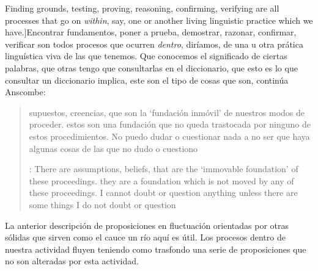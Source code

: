 Finding grounds, testing, proving, reasoning, confirming, verifying are all processes that go on \emph{within}, say, one or another living linguistic practice which we have.]{Encontrar fundamentos, poner a prueba, demostrar, razonar, confirmar, verificar son todos procesos que ocurren \emph{dentro}, diríamos, de una u otra prática linguística viva de las que tenemos.} Que conocemos el significado de ciertas palabras, que otras tengo que consultarlas en el diccionario, que esto es lo que consultar un diccionario implica, este son el tipo de cosas que son, continúa Anscombe: \blockquote[{\cite[130]{anscombe1981parmenides:qli}}: There are assumptions, beliefs, that are the `immovable foundation' of these proceedings. \textelp{} they are a foundation which is not moved by any of these proceedings. I cannot doubt or question anything unless there are some things I do not doubt or question]{supuestos, creencias, que son la `fundación inmóvil' de nuestros modos de proceder. \textelp{} estos son una fundación que no queda trastocada por ninguno de estos procedimientos. No puedo dudar o cuestionar nada a no ser que haya algunas cosas de las que no dudo o cuestiono}. La anterior descripción de proposiciones en fluctuación orientadas por otras sólidas que sirven como el cauce un río aquí es útil. Los procesos dentro de nuestra actividad fluyen teniendo como trasfondo una serie de proposiciones que no son alteradas por esta actividad.

